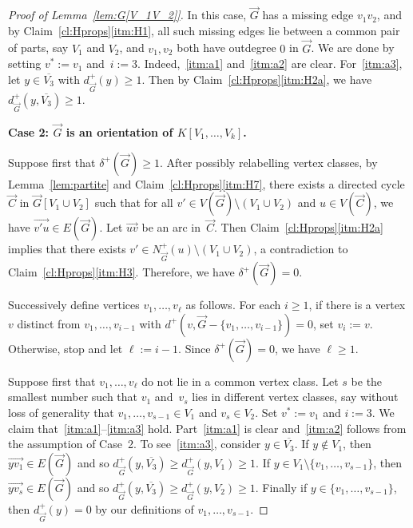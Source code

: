 \documentclass[a4paper, 12pt]{article}
\numberwithin{equation}{section}
\def\sm{{\setminus}}
\newcommand{\ova}[1]{\overrightarrow{#1}}
\begin{document}
\begin{proof}[Proof of Lemma~\ref{lem:G[V_1V_2]}]
\medskip
\noindent
In this case, $\ova{G}$ has a missing edge $v_1v_2$, and by Claim~\ref{cl:Hprops}\ref{itm:H1}, all such missing edges lie between a common pair of parts, say $V_1$ and $V_2$, and $v_1,v_2$ both have outdegree $0$ in $\ova{G}$.
We are done by setting $v^* := v_1$ and~$i := 3$.
Indeed,~\ref{itm:a1} and~\ref{itm:a2} are clear.
For~\ref{itm:a3}, let $y \in \overline{V_3}$ with $d^+_{\ova{G}}(y)\ge 1$. Then by Claim~\ref{cl:Hprops}\ref{itm:H2a}, we have $d^+_{\ova{G}}(y,\overline{V_3})\ge 1$.

\medskip
\noindent
\textbf{Case 2: $\ova{G}$ is an orientation of $K[V_1,\ldots,V_k]$. }

\medskip
\noindent
Suppose first that $\delta^+(\ova{G}) \ge 1$. 
After possibly relabelling vertex classes, by Lemma~\ref{lem:partite} and Claim~\ref{cl:Hprops}\ref{itm:H7}, there exists a directed cycle~$\ova{C}$ in $\ova{G}[V_1 \cup V_2]$ such that for all $v' \in V(\ova{G}) \sm (V_1 \cup V_2)$ and $u \in V(\ova{C})$, we have $\ova{v'u}\in E(\ova{G})$.
Let $\ova{uv}$ be an arc in~$\ova{C}$. 
Then Claim~\ref{cl:Hprops}\ref{itm:H2a} implies that there exists $v' \in N^+_{\ova{G}}(u) \setminus (V_1 \cup V_2)$, a contradiction to Claim~\ref{cl:Hprops}\ref{itm:H3}. 
Therefore, we have $\delta^+(\ova{G}) = 0$. 

Successively define vertices $v_1,\ldots,v_\ell$ as follows.
For each $i \geq 1$, if there is a vertex $v$ distinct from $v_1,\ldots,v_{i-1}$ with $d^+(v,\ova{G}-\{v_1,\ldots,v_{i-1}\}) = 0$, set $v_i := v$. Otherwise, stop and let $\ell := i-1$.
Since $\delta^+(\ova{G}) = 0$, we have $\ell \ge 1$. 

Suppose first that $v_1, \dots, v_\ell$ do not lie in a common vertex class. 
Let $s$ be the smallest number such that $v_1$ and~$v_s$ lies in different vertex classes, say without loss of generality that $v_1,\ldots,v_{s-1} \in V_{1}$ and $v_s \in V_{2}$. 
Set $v^* := v_1$ and $i :=3$.
We claim that~\ref{itm:a1}--\ref{itm:a3} hold.
Part~\ref{itm:a1} is clear and~\ref{itm:a2} follows from the assumption of Case~2.
To see~\ref{itm:a3}, consider $y \in \overline{V_3}$.
If $y \notin V_{1}$, then $\ova{y v_1} \in E (\ova{G})$ and so $d^+_{\ova{G}}(y,  \overline{V_3} ) \ge d^+_{\ova{G}}(y,  V_1 ) \ge 1$.
If $y \in V_{1} \sm \{v_1,\dots, v_{s-1}\}$, then $\ova{y v_s} \in E (\ova{G})$ and so $d^+_{\ova{G}}(y,  \overline{V_3} ) \ge  d^+_{\ova{G}}(y,  V_2 ) \ge 1$.
Finally if $y \in \{v_1,\dots, v_{s-1}\}$, then $d^+_{\ova{G}}(y) = 0$ by our definitions of $v_1,\dots, v_{s-1}$. 



\end{proof}
\end{document}
